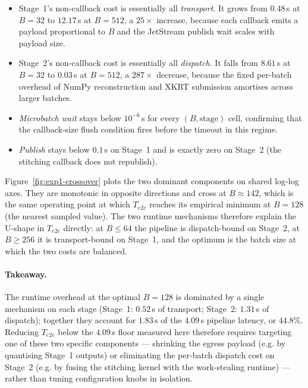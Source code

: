 \begin{itemize}
  \item Stage~1's non-callback cost is essentially all \emph{transport}.
        It grows from $0.48$\,s at $B{=}32$ to $12.17$\,s at $B{=}512$,
        a $25\times$ increase, because each callback emits a payload
        proportional to $B$ and the JetStream publish wait scales with
        payload size.
  \item Stage~2's non-callback cost is essentially all \emph{dispatch}.
        It falls from $8.61$\,s at $B{=}32$ to $0.03$\,s at $B{=}512$,
        a $287\times$ decrease, because the fixed per-batch overhead of
        NumPy reconstruction and XKRT submission amortises across
        larger batches.
  \item \emph{Microbatch wait} stays below $10^{-6}$\,s for every
        $(B, \text{stage})$ cell, confirming that the callback-size
        flush condition fires before the timeout in this regime.
  \item \emph{Publish} stays below $0.1$\,s on Stage~1 and is exactly
        zero on Stage~2 (the stitching callback does not republish).
\end{itemize}

Figure~\ref{fig:exp1-crossover} plots the two dominant components on
shared log-log axes.  They are monotonic in opposite directions and
cross at $B \approx 142$, which is the same operating point at which
$T_{e2e}$ reaches its empirical minimum at $B{=}128$ (the nearest
sampled value).  The two runtime mechanisms therefore explain the
U-shape in $T_{e2e}$ directly: at $B \leq 64$ the pipeline is
dispatch-bound on Stage~2, at $B \geq 256$ it is transport-bound on
Stage~1, and the optimum is the batch size at which the two costs are
balanced.

\paragraph{Takeaway.}
The runtime overhead at the optimal $B{=}128$ is dominated by a single
mechanism on each stage (Stage~1: $0.52$\,s of transport; Stage~2:
$1.31$\,s of dispatch); together they account for $1.83$\,s of the
$4.09$\,s pipeline latency, or $44.8\%$.  Reducing $T_{e2e}$ below the
$4.09$\,s floor measured here therefore requires targeting one of these
two specific components --- shrinking the egress payload (e.g. by
quantising Stage~1 outputs) or eliminating the per-batch dispatch cost
on Stage~2 (e.g. by fusing the stitching kernel with the work-stealing
runtime) --- rather than tuning configuration knobs in isolation.

